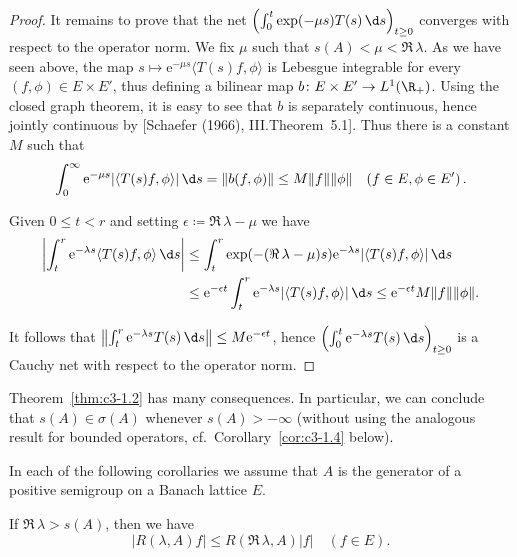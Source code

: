 \begin{proof}
It remains to prove that the net $\left(\int_{0}^t \exp(-\mu s)T(s) \,\d s\right)_{t\geq 0}$ converges with respect to the operator norm.
We fix $\mu$ such that $s(A) < \mu < \Re\, \lambda$.
As we have seen above, the map $s \mapsto \mathrm{e}^{-\mu s}\langle T(s)f,\phi\rangle$ is Lebesgue integrable for every $(f,\phi) \in E \times E'$, thus defining a bilinear map $b \colon E \times E' \to L^1(\R _{+})$.
Using the closed graph theorem, it is easy to see that $b$ is separately continuous, hence jointly continuous by [Schaefer (1966), III.Theorem~5.1].
Thus there is a constant $M$ such that
\begin{equation}\label{eq:c3-1.4}
	\int_{0}^{\infty} \mathrm{e}^{-\mu s}|\langle T(s)f,\phi\rangle| \,\d s = \|b(f,\phi)\| \leq M\|f\|\|\phi\| \quad (f \in E, \phi \in E')\,.
\end{equation}

Given $0 \leq t < r$ and setting $\epsilon \coloneqq \Re\, \lambda - \mu$ we have
\begin{align*}
	\left|\int_{t}^r \mathrm{e}^{-\lambda s}\langle T(s)f,\phi\rangle \,\d s\right| &\leq \int_{t}^r \exp(-(\Re\,\lambda-\mu)s)\mathrm{e}^{-\lambda s}|\langle T(s)f,\phi\rangle| \,\d s \\
	&\leq \mathrm{e}^{-\epsilon t}\int_{t}^r \mathrm{e}^{-\lambda s}|\langle T(s)f,\phi\rangle| \,\d s \leq \mathrm{e}^{-\epsilon t} M\|f\|\|\phi\|.
\end{align*}

It follows that $\left\|\int_{t}^r \mathrm{e}^{-\lambda s}T(s) \,\d s\right\| \leq M\mathrm{e}^{-\epsilon t}$, hence $\left(\int_{0}^t \mathrm{e}^{-\lambda s}T(s) \,\d s\right)_{t\geq 0}$ is a Cauchy net with respect to the operator norm.
\end{proof}

Theorem~\ref{thm:c3-1.2} has many consequences.
In particular, we can conclude that $s(A) \in \sigma(A)$ whenever $s(A) > -\infty$ (without using the analogous result for bounded operators, cf.\ Corollary~\ref{cor:c3-1.4} below).

In each of the following corollaries we assume that $A$ is the generator of a positive semigroup on a Banach lattice $E$.

\begin{corollary}\label{cor:c3-1.3}
If $\Re\, \lambda > s(A)$, then we have
\begin{equation}\label{eq:c3-1.5}
	|R(\lambda,A)f| \leq R(\Re\,\lambda,A) |f| \quad (f \in E).
\end{equation}
\end{corollary}

